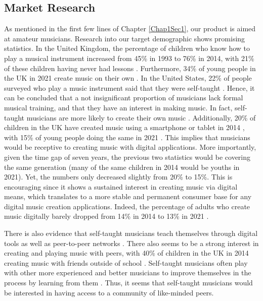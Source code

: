\subsection{Market Research}
\label{marketresearch}
As mentioned in the first few lines of Chapter \ref{Chap1Sec1}, our product is aimed at amateur musicians. Research into our target demographic shows promising statistics. In the United Kingdom, the percentage of children who know how to play a musical instrument increased from 45\% in 1993 to 76\% in 2014, with 21\% of these children having never had lessons \cite{abrsm2014}. Furthermore, 34\% of young people in the UK in 2021 create music on their own \cite{abrsm2021}. In the United States, 22\% of people surveyed who play a music instrument said that they were self-taught \cite{gallup2003}. Hence, it can be concluded that a not insignificant proportion of musicians lack formal musical training, and that they have an interest in making music. In fact, self-taught musicians are more likely to create their own music \cite{compareguitarpiano}. Additionally, 20\% of children in the UK have created music using a smartphone or tablet in 2014 \cite{abrsm2014}, with 15\% of young people doing the same in 2021 \cite{abrsm2021}. This implies that musicians would be receptive to creating music with digital applications. More importantly, given the time gap of seven years, the previous two statistics would be covering the same generation (many of the same children in 2014 would be youths in 2021). Yet, the numbers only decreased slightly from 20\% to 15\%. This is encouraging since it shows a sustained interest in creating music via digital means, which translates to a more stable and permanent consumer base for any digital music creation applications. Indeed, the percentage of adults who create music digitally barely dropped from 14\% in 2014 to 13\% in 2021 \cite{abrsm2021}.
 
There is also evidence that self-taught musicians teach themselves through digital tools as well as peer-to-peer networks \cite{abrsm2014} \cite{bookreview}. There also seems to be a strong interest in creating and playing music with peers, with 40\% of children in the UK in 2014 creating music with friends outside of school \cite{abrsm2014}. Self-taught musicians often play with other more experienced and better musicians to improve themselves in the process by learning from them \cite{marketresearch5}. Thus, it seems that self-taught musicians would be interested in having access to a community of like-minded peers. 
 
